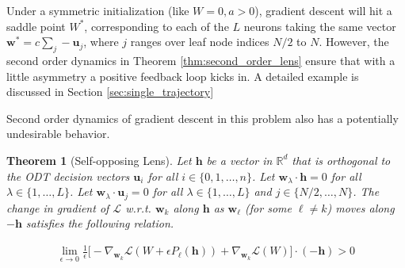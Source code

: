 \documentclass{article}
\theoremstyle{plain}
\newtheorem{theorem}{Theorem}[section]
\theoremstyle{definition}
\theoremstyle{remark}
\newcommand{\R}{{\mathbb R}}
\newcommand{\E}{{\mathbf E}}
\newcommand{\1}{{\mathbf 1}}
\newcommand{\0}{{\mathbf 0}}
\newcommand{\h}{{\mathbf h}}
\newcommand{\w}{{\mathbf w}}
\newcommand{\x}{{\mathbf x}}
\newcommand{\bu}{{\mathbf u}}
\renewcommand{\>}{{\rightarrow}}
\begin{document}

Under a symmetric initialization (like $W=0, a>0$), gradient descent will hit a saddle point $W^*$,  corresponding to each of the $L$ neurons taking the same vector $\w^* = c \sum_j -\bu_j$,  where $j$ ranges over leaf node indices $N/2$ to $N$.  However,  the second order dynamics in Theorem \ref{thm:second_order_lens} ensure that with a little asymmetry a positive feedback loop kicks in. A detailed example is discussed in Section \ref{sec:single_trajectory}

Second order dynamics of gradient descent in this problem also has a potentially undesirable behavior.


\begin{theorem}[Self-opposing Lens]
\label{thm:second_order_backlash}
Let $\h$ be a vector in $\R^d$ that is orthogonal to the ODT decision vectors $\bu_i$ for all $i \in \{0,1,\ldots,n\}$. 
Let $\w_\lambda \cdot \h = 0$ for all $\lambda \in\{1,\ldots,L\}$. Let $\w_\lambda \cdot \bu_j = 0$ for all $\lambda \in\{1,\ldots,L\}$ and $j \in \{N/2,\ldots, N\}$. The change in gradient of $\mathcal{L}$ w.r.t. $\w_k$ along $\h$  as $\w_\ell$ (for some $\ell \neq k$) moves along $-\h$ satisfies the following relation.


\begin{align*}
\lim_{\epsilon \to 0} \frac{1}{\epsilon} \bigg[ 
 -\nabla_{\w_k} \mathcal{L}(W + \epsilon P_\ell(\h))  
 + \nabla_{\w_k} \mathcal{L}(W)  \bigg]\cdot (-\h) > 0
\end{align*}
\end{theorem}
\end{document}

